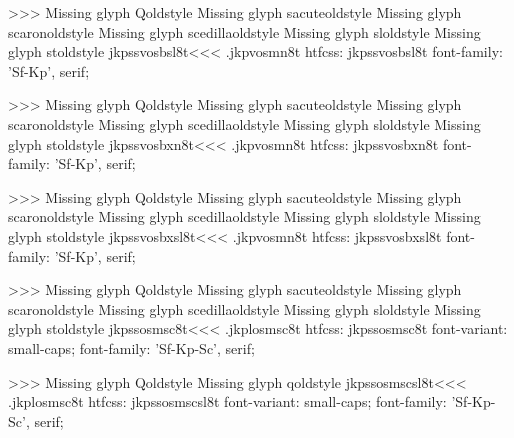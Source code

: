 >>>
Missing glyph	Qoldstyle
Missing glyph	sacuteoldstyle
Missing glyph	scaronoldstyle
Missing glyph	scedillaoldstyle
Missing glyph	sloldstyle
Missing glyph	stoldstyle
\<jkpssvosbsl8t\><<<
.jkpvosmn8t
htfcss:  jkpssvosbsl8t  font-family: 'Sf-Kp', serif;

>>>
Missing glyph	Qoldstyle
Missing glyph	sacuteoldstyle
Missing glyph	scaronoldstyle
Missing glyph	scedillaoldstyle
Missing glyph	sloldstyle
Missing glyph	stoldstyle
\<jkpssvosbxn8t\><<<
.jkpvosmn8t
htfcss:  jkpssvosbxn8t  font-family: 'Sf-Kp', serif;

>>>
Missing glyph	Qoldstyle
Missing glyph	sacuteoldstyle
Missing glyph	scaronoldstyle
Missing glyph	scedillaoldstyle
Missing glyph	sloldstyle
Missing glyph	stoldstyle
\<jkpssvosbxsl8t\><<<
.jkpvosmn8t
htfcss:  jkpssvosbxsl8t  font-family: 'Sf-Kp', serif;

>>>
Missing glyph	Qoldstyle
Missing glyph	sacuteoldstyle
Missing glyph	scaronoldstyle
Missing glyph	scedillaoldstyle
Missing glyph	sloldstyle
Missing glyph	stoldstyle
\<jkpssosmsc8t\><<<
.jkplosmsc8t
htfcss:  jkpssosmsc8t  font-variant: small-caps; font-family: 'Sf-Kp-Sc', serif;

>>>
Missing glyph	Qoldstyle
Missing glyph	qoldstyle
\<jkpssosmscsl8t\><<<
.jkplosmsc8t
htfcss:  jkpssosmscsl8t  font-variant: small-caps; font-family: 'Sf-Kp-Sc', serif;

